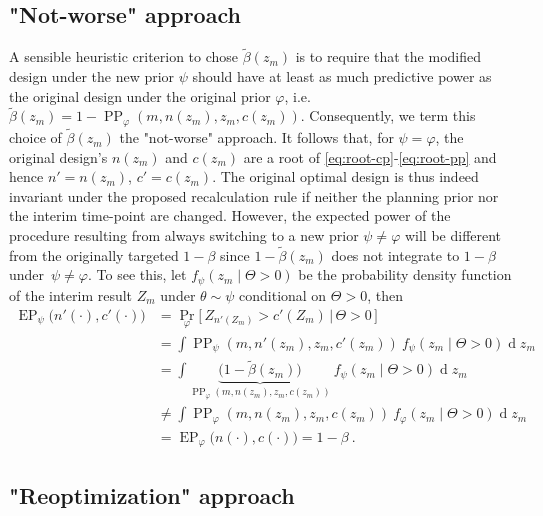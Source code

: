 \documentclass[12pt]{article}
\renewcommand{\Pr}{\operatorname{Pr}}
\newcommand{\PP}{\ensuremath{\operatorname{PP}}}
\newcommand{\EP}{\ensuremath{\operatorname{EP}}}
\renewcommand{\Pr}{\ensuremath{\operatorname{Pr}}}
\begin{document}
\subsection{"Not-worse" approach}
\label{sec:not-worse}

A sensible heuristic criterion to chose $\widetilde{\beta}(z_m)$ is to require that the modified design under the new prior $\psi$ should have at least as much predictive power as the original design under the original prior $\varphi$,
i.e.~$\widetilde{\beta}(z_m) = {1 - \PP_\varphi(m, n(z_m), z_{m}, c(z_m))}$.
Consequently, we term this choice of $\widetilde{\beta}(z_m)$ the "not-worse" approach.
It follows that, for $\psi=\varphi$,
the original design's $n(z_m)$ and $c(z_m)$ are a root of \eqref{eq:root-cp}-\eqref{eq:root-pp} and hence ${n'=n(z_{m})}$, ${c'=c(z_m)}$.
The original optimal design is thus indeed invariant under the
proposed recalculation rule if neither the planning prior nor the interim time-point are changed.
However, the
expected power of the procedure resulting from always switching to
a new prior $\psi\neq\varphi$ will be different from the originally targeted $1-\beta$ since $1-\widetilde{\beta}(z_m)$ does not integrate to $1 - \beta$ under~$\psi\neq\varphi$.
To see this, let $f_\psi(z_m \mid \Theta>0)$ be the probability density function of the interim result $Z_m$ under $\theta\sim\psi$ conditional on $\Theta>0$, then
{\small
\begin{align}
    \EP_\psi\big(n'(\cdot), c'(\cdot)\big) &=
    \Pr_\varphi\big[\,Z_{n'(Z_m)}>c'(Z_m)\,|\,\Theta>0\,\big]  \\
    &= \int \PP_\psi(m, n'(z_m), z_{m}, c'(z_m)) \ f_\psi(z_m \mid \Theta > 0) \operatorname{d} z_m \\
    &= \int \underbrace{\big(1 - \widetilde{\beta}(z_{m})\big)}_{\PP_\varphi(m, n(z_m), z_{m}, c(z_m))} \ f_\psi(z_m \mid \Theta > 0) \operatorname{d} z_m \\
    &\neq \int \PP_\varphi(m, n(z_m), z_{m}, c(z_m)) \ f_\varphi(z_m \mid \Theta > 0) \operatorname{d} z_m \\
    &= \EP_\varphi\big(n(\cdot), c(\cdot)\big) = 1 - \beta \ .
\end{align}}



\subsection{"Reoptimization" approach}
\label{sec:reoptimize}
\end{document}
